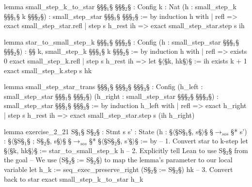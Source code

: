 \begin{Lean_Code}
lemma small_step_k_to_star {§\gamma§§\(_1\)§ §\gamma§§\(_2\)§ : Config} {k : Nat}
  (h : small_step_k §\gamma§§\(_1\)§ k §\gamma§§\(_2\)§) : small_step_star §\gamma§§\(_1\)§ §\gamma§§\(_2\)§ := by
  induction h with
  | refl => exact small_step_star.refl
  | step s h_rest ih => exact small_step_star.step s ih


lemma star_to_small_step_k {§\gamma§§\(_1\)§ §\gamma§§\(_2\)§ : Config}
  (h : small_step_star §\gamma§§\(_1\)§ §\gamma§§\(_2\)§) : §\exists§ k, small_step_k §\gamma§§\(_1\)§ k §\gamma§§\(_2\)§ := by
  induction h with
  | refl =>
    exists 0
    exact small_step_k.refl
  | step s h_rest ih =>
    let §\(\langle\)§k, hk§\(\rangle\)§ := ih
    exists k + 1
    exact small_step_k.step s hk

lemma small_step_star_trans {§\gamma§§\(_1\)§ §\gamma§§\(_2\)§ §\gamma§§\(_3\)§ : Config}
  (h_left : small_step_star §\gamma§§\(_1\)§ §\gamma§§\(_2\)§) (h_right : small_step_star §\gamma§§\(_2\)§ §\gamma§§\(_3\)§) :
  small_step_star §\gamma§§\(_1\)§ §\gamma§§\(_3\)§ := by
  induction h_left with
  | refl => exact h_right
  | step s h_rest ih => exact small_step_star.step s (ih h_right)

lemma exercise_2_21 {S§\(_1\)§ S§\(_2\)§ : Stmt} {s s' : State}
  (h : §\(\langle\)§S§\(_1\)§, s§\(\rangle\)§ §\(\to_{sos}\)§* s') : §\(\langle\)§S§\(_1\)§ ; S§\(_2\)§, s§\(\rangle\)§ §\(\to_{sos}\)§* §\(\langle\)§S§\(_2\)§, s'§\(\rangle\)§ := by
  -- 1. Convert star to k-step
  let §\(\langle\)§k, hk§\(\rangle\)§ := star_to_small_step_k h
  -- 2. Explicitly tell Lean to use S§\(_2\)§ from the goal
  -- We use (S§\(_2\)§ := S§\(_2\)§) to map the lemma's parameter to our local variable
  let h_k := seq_exec_preserve_right (S§\(_2\)§ := S§\(_2\)§) hk
  -- 3. Convert back to star
  exact small_step_k_to_star h_k
\end{Lean_Code}
